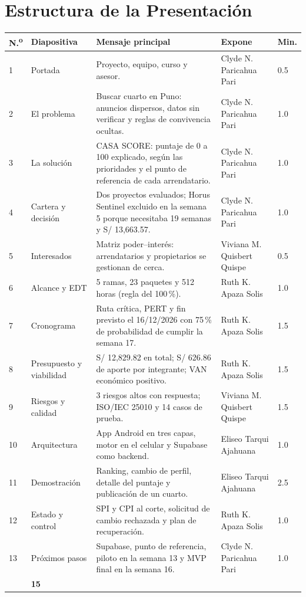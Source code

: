 \documentclass[11pt,a4paper]{article}
\begin{document}
\section{Estructura de la Presentación}
{\footnotesize
\setlength{\tabcolsep}{3.5pt}
\noindent\begin{tabularx}{\textwidth}{@{}C{0.6cm} P{2.9cm} L P{2.7cm} C{1.1cm}@{}}
\toprule
{}
\textbf{N.\textsuperscript{o}} & \textbf{Diapositiva} & \textbf{Mensaje principal} & \textbf{Expone} & \textbf{Min.} \\
 & Portada & Proyecto, equipo, curso y asesor. & Clyde N. Paricahua Pari & 0.5 \\
2 & El problema & Buscar cuarto en Puno: anuncios dispersos, datos sin verificar y reglas de convivencia ocultas. & Clyde N. Paricahua Pari & 1.0 \\
3 & La solución & CASA SCORE: puntaje de 0 a 100 explicado, según las prioridades y el punto de referencia de cada arrendatario. & Clyde N. Paricahua Pari & 1.0 \\
4 & Cartera y decisión & Dos proyectos evaluados; Horus Sentinel excluido en la semana 5 porque necesitaba 19 semanas y S/ 13,663.57. & Clyde N. Paricahua Pari & 1.0 \\
5 & Interesados & Matriz poder--interés: arrendatarios y propietarios se gestionan de cerca. & Viviana M. Quisbert Quispe & 0.5 \\
6 & Alcance y EDT & 5 ramas, 23 paquetes y 512 horas (regla del 100\,\%). & Ruth K. Apaza Solis & 1.0 \\
7 & Cronograma & Ruta crítica, PERT y fin previsto el 16/12/2026 con 75\,\% de probabilidad de cumplir la semana 17. & Ruth K. Apaza Solis & 1.5 \\
8 & Presupuesto y viabilidad & S/ 12,829.82 en total; S/ 626.86 de aporte por integrante; VAN económico positivo. & Ruth K. Apaza Solis & 1.5 \\
9 & Riesgos y calidad & 3 riesgos altos con respuesta; ISO/IEC 25010 y 14 casos de prueba. & Viviana M. Quisbert Quispe & 1.5 \\
10 & Arquitectura & App Android en tres capas, motor en el celular y Supabase como backend. & Eliseo Tarqui Ajahuana & 1.0 \\
11 & Demostración & Ranking, cambio de perfil, detalle del puntaje y publicación de un cuarto. & Eliseo Tarqui Ajahuana & 2.5 \\
12 & Estado y control & SPI y CPI al corte, solicitud de cambio rechazada y plan de recuperación. & Ruth K. Apaza Solis & 1.0 \\
13 & Próximos pasos & Supabase, punto de referencia, piloto en la semana 13 y MVP final en la semana 16. & Clyde N. Paricahua Pari & 1.0 \\
\midrule
{} & \textbf{15} \\
\bottomrule
\end{tabularx}
}
\end{document}
